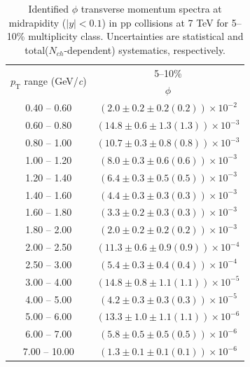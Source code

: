 \begin{table}
\caption{Identified $\phi$ transverse momentum spectra at midrapidity ($|y|<0.1$) in pp collisions at 7 TeV for 5--10\% multiplicity class. Uncertainties are statistical and total($N_{ch}$-dependent) systematics, respectively.}
\label{tab:Phi_5to10}
\begin{center}
\begin{tabular}{ c | c }
\hline
\multirow{2}{*}{$p_{\mathrm{T}}$ range (GeV/\textit{c})} & \multicolumn{1}{c}{5--10\%} \\ & $\phi$\\ 
\hline
0.40 -- 0.60 & $(2.0\pm0.2\pm0.2(0.2))\times10^{-2}$ \\ 
0.60 -- 0.80 & $(14.8\pm0.6\pm1.3(1.3))\times10^{-3}$ \\ 
0.80 -- 1.00 & $(10.7\pm0.3\pm0.8(0.8))\times10^{-3}$ \\ 
1.00 -- 1.20 & $(8.0\pm0.3\pm0.6(0.6))\times10^{-3}$ \\ 
1.20 -- 1.40 & $(6.4\pm0.3\pm0.5(0.5))\times10^{-3}$ \\ 
1.40 -- 1.60 & $(4.4\pm0.3\pm0.3(0.3))\times10^{-3}$ \\ 
1.60 -- 1.80 & $(3.3\pm0.2\pm0.3(0.3))\times10^{-3}$ \\ 
1.80 -- 2.00 & $(2.0\pm0.2\pm0.2(0.2))\times10^{-3}$ \\ 
2.00 -- 2.50 & $(11.3\pm0.6\pm0.9(0.9))\times10^{-4}$ \\ 
2.50 -- 3.00 & $(5.4\pm0.3\pm0.4(0.4))\times10^{-4}$ \\ 
3.00 -- 4.00 & $(14.8\pm0.8\pm1.1(1.1))\times10^{-5}$ \\ 
4.00 -- 5.00 & $(4.2\pm0.3\pm0.3(0.3))\times10^{-5}$ \\ 
5.00 -- 6.00 & $(13.3\pm1.0\pm1.1(1.1))\times10^{-6}$ \\ 
6.00 -- 7.00 & $(5.8\pm0.5\pm0.5(0.5))\times10^{-6}$ \\ 
7.00 -- 10.00 & $(1.3\pm0.1\pm0.1(0.1))\times10^{-6}$ \\ 
\hline
\end{tabular}
\end{center}
\end{table}
 
